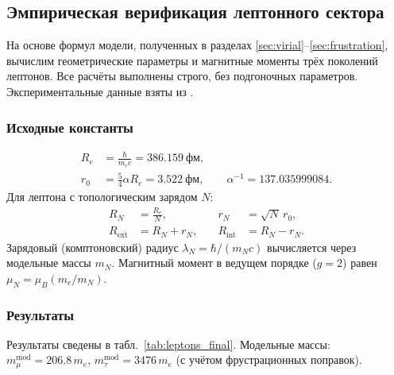 \documentclass[11pt,a4paper]{article}
\begin{document}
	\subsection{Эмпирическая верификация лептонного сектора}
	\label{sec:lepton_verification}

На основе формул модели, полученных в разделах \ref{sec:virial}--\ref{sec:frustration}, вычислим геометрические параметры и магнитные моменты трёх поколений лептонов. Все расчёты выполнены строго, без подгоночных параметров. Экспериментальные данные взяты из \cite{PDG:2024}.

\subsubsection{Исходные константы}
\begin{align}
R_e &= \frac{\hbar}{m_e c} = 386.159\ \text{фм}, \\
r_0 &= \frac{5}{4}\alpha R_e = 3.522\ \text{фм},\qquad \alpha^{-1}=137.035999084.
\end{align}
Для лептона с топологическим зарядом $N$:
\begin{align}
R_N &= \frac{R_e}{N}, &\quad r_N &= \sqrt{N}\, r_0, \\
R_{\text{ext}} &= R_N + r_N, &\quad R_{\text{int}} &= R_N - r_N.
\end{align}
Зарядовый (комптоновский) радиус $\lambda_N = \hbar/(m_N c)$ вычисляется через модельные массы $m_N$. Магнитный момент в ведущем порядке ($g=2$) равен $\mu_N = \mu_B (m_e/m_N)$.

\subsubsection{Результаты}
Результаты сведены в табл.~\ref{tab:leptons_final}. Модельные массы: $m_\mu^{\text{mod}}=206.8\,m_e$, $m_\tau^{\text{mod}}=3476\,m_e$ (с учётом фрустрационных поправок).
\end{document}
